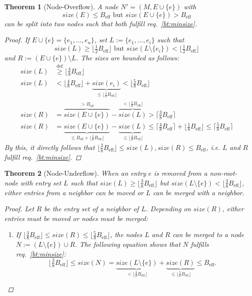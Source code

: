 \documentclass[a4paper, 9pt]{scrartcl}
\theoremstyle{plain}
\newtheorem{thm}{Theorem}[section]
\theoremstyle{definition}
\theoremstyle{remark}
\newcommand{\Beff}{ B_{\text{eff}} }
\begin{document}
\begin{multicols}{2}
\begin{thm}[Node-Overflow]
A node \mbox{$N' = (M, E \cup \{ e \})$} with 
\[ size(E) \leq \Beff \text{ but } size(E \cup \{e\}) > \Beff \]
can be split into two nodes such that both fulfill req.~\ref{bt:minsize}.

\begin{proof}
If \mbox{$E \cup \{e\} = \{ e_1, \ldots, e_n \}$}, set
\mbox{$L := \{ e_1, \ldots, e_i \}$} such that
\[ size(L) \geq \lfloor \tfrac{1}{2} \Beff \rfloor \text{ but }
size(L \setminus \{e_i\}) < \lfloor \tfrac{1}{2} \Beff \rfloor \]
and \mbox{$R := (E \cup \{e\}) \setminus L$}.
The sizes are bounded as follows:
\begin{align*}
size(L) &\stackrel{\mathrm{def}}{\geq} \lfloor \tfrac{4}{8} \Beff \rfloor\\
size(L) &< \lfloor \tfrac{4}{8} \Beff \rfloor
		+ \underbrace{size(e_i)}_{\leq \lfloor \frac{1}{8} \Beff \rfloor}
	< \lfloor \tfrac{5}{8} \Beff \rfloor\\
size(R) &= \overbrace{size(E \cup \{e\})}^{> \Beff}
		- \overbrace{size(L)}^{< \lfloor \frac{5}{8} \Beff \rfloor}
	> \lceil \tfrac{3}{8} \Beff \rceil\\
size(R) &= \underbrace{size(E \cup \{e\})}_{
			\leq \Beff + \lfloor \frac{1}{8} \Beff \rfloor}
		- \underbrace{size(L)}_{\leq \lfloor \frac{4}{8} \Beff \rfloor}
	\leq \lceil \tfrac{4}{8} \Beff \rceil + \lfloor \tfrac{1}{8} \Beff \rfloor
	\leq \lceil \tfrac{5}{8} \Beff \rceil
\end{align*}
By this, it directly follows that 
\mbox{$\lfloor \tfrac{3}{8} \Beff \rfloor \leq size(L), size(R) \leq \Beff$}, 
i.e.  $L$ and $R$ fulfill req.~\ref{bt:minsize}.
\end{proof}
\end{thm}


\begin{thm}[Node-Underflow]
When an entry $e$ is removed from a non-root-node with entry set $L$ such that 
$size(L) \geq \lfloor \tfrac{3}{8} \Beff \rfloor$ but
$size(L \setminus \{e\}) < \lfloor \tfrac{3}{8} \Beff \rfloor$, either entries
from a neighbor can be moved or $L$ can be merged with a neighbor.

\begin{proof}
Let $R$ be the entry set of a neighbor of $L$.
Depending on $size(R)$, either entries must be moved or nodes must be merged:
\begin{enumerate}
\item
If $\lfloor \tfrac{3}{8} \Beff \rfloor \leq size(R) 
\leq \lfloor \tfrac{5}{8} \Beff \rfloor$, the nodes $L$ and $R$ can be
merged to a node \mbox{$N := (L \setminus \{e\}) \cup R$}.
The following equation shows that $N$ fulfills req.~\ref{bt:minsize}:
\[ \lfloor \tfrac{3}{8} \Beff \rfloor 
\leq size(N)
= \underbrace{size(L \setminus \{e\})}_{< \lfloor \frac{3}{8} \Beff \rfloor}
	+ \underbrace{size(R)}_{\leq \lfloor \frac{5}{8} \Beff \rfloor}
\leq \Beff.\]


\end{enumerate}
\end{proof}
\end{thm}
\end{multicols}
\end{document}
